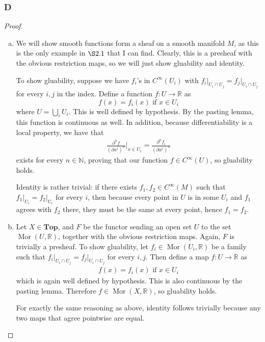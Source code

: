 \documentclass{article}
\newcommand{\R}{\mathbb{R}}
\newcommand{\N}{\mathbb{N}}
\DeclareMathOperator{\Mor}{Mor}
\newcommand{\Top}{\mathbf{Top}} %
\begin{document}
\subsubsection{D}\label{2.2.D}
\begin{proof}
    \begin{enumerate}[(a)]
    \item We will show smooth functions form a sheaf on a smooth manifold $M$, as this is the only example in $\S 2.1$ that I can find. Clearly, this is a presheaf with the obvious restriction maps, so we will just show gluability and identity.

    \vspace{\baselineskip}
    To show gluability, suppose we have $f_i$'s in $C^\infty(U_i)$ with $f_i\vert_{U_i\cap U_j}=f_j\vert_{U_i\cap U_j}$ for every $i,j$ in the index. Define a function $f:U\to \R$ as
    \[
    f(x)=f_i(x) \text{ if } x\in U_i
    \]
    where $U=\bigcup_i U_i$. This is well defined by hypothesis. By the pasting lemma, this function is continuous as well. In addition, because differentiability is a local property, we have that
    \begin{align*}
        \frac{\partial^n f}{(\partial x^i)^n}\vert_{x\in U_i}=\frac{\partial^n f_i}{(\partial x^i)^n}
    \end{align*}
    exists for every $n\in \N$, proving that our function $f\in C^\infty(U)$, so gluability holds.

    \vspace{\baselineskip}
    Identity is rather trivial: if there exists $f_1,f_2\in C^\infty(M)$ such that $f_1\vert_{U_i}=f_2\vert_{U_i}$ for every $i$, then because every point in $U$ is in some $U_i$ and $f_1$ agrees with $f_2$ there, they must be the same at every point, hence $f_1=f_2$.
    \item Let $X\in \Top$, and $F$ be the functor sending an open set $U$ to the set $\Mor(U,\R)$, together with the obvious restriction maps. Again, $F$ is trivially a presheaf. To show gluability, let $f_i\in \Mor(U_i,\R)$ be a family such that $f_i\vert_{U_i\cap U_j}=f_j\vert_{U_i\cap U_j}$ for every $i,j$. Then define a map $f:U\to \R$ as
    \begin{align*}
        f(x)= f_i(x) \text{ if }x\in U_i
    \end{align*}
    which is again well defined by hypothesis. This is also continuous by the pasting lemma. Therefore $f\in \Mor(X,\R)$, so gluability holds.

    \vspace{\baselineskip}
    For exactly the same reasoning as above, identity follows trivially because any two maps that agree pointwise are equal.
\end{enumerate}
\end{proof}
\end{document}
